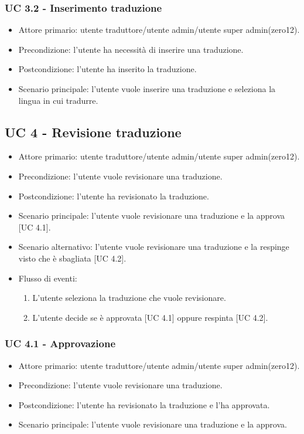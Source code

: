     \subsubsection{UC 3.2 - Inserimento traduzione}
        \begin{itemize}
            \item Attore primario: utente traduttore/utente admin/utente super admin(zero12).
            \item Precondizione: l'utente ha necessità di inserire una traduzione.
            \item Postcondizione: l'utente ha inserito la traduzione.
            \item Scenario principale: l'utente vuole inserire una traduzione e seleziona la lingua in cui tradurre.
        \end{itemize}
\subsection{UC 4 - Revisione traduzione}
    \begin{itemize}
        \item Attore primario: utente traduttore/utente admin/utente super admin(zero12).
        \item Precondizione: l'utente vuole revisionare una traduzione.
        \item Postcondizione: l'utente ha revisionato la traduzione.
        \item Scenario principale: l'utente vuole revisionare una traduzione e la approva [UC 4.1].
        \item Scenario alternativo: l'utente vuole revisionare una traduzione e la respinge visto che è sbagliata [UC 4.2].
        \item Flusso di eventi:
            \begin{enumerate}
                \item L'utente seleziona la traduzione che vuole revisionare.
                \item L'utente decide se è approvata [UC 4.1] oppure respinta [UC 4.2].
            \end{enumerate}
    \end{itemize}
    \subsubsection{UC 4.1 - Approvazione}
        \begin{itemize}
            \item Attore primario: utente traduttore/utente admin/utente super admin(zero12).
            \item Precondizione: l'utente vuole revisionare una traduzione.
            \item Postcondizione: l'utente ha revisionato la traduzione e l'ha approvata.
            \item Scenario principale: l'utente vuole revisionare una traduzione e la approva.
        \end{itemize}
